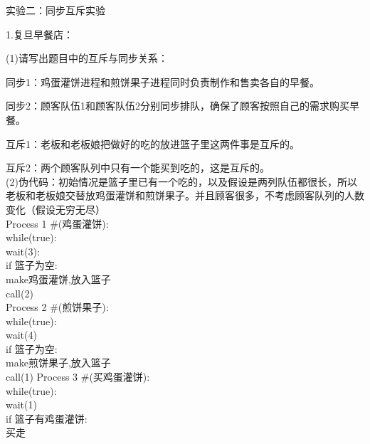 \documentclass[12pt]{article}
\begin{document}
\begin{Large}
    \noindent 实验二：同步互斥实验\\
\end{Large}
\begin{large}
    \noindent 1.复旦早餐店：\\
\end{large}
(1)请写出题目中的互斥与同步关系：\par
同步1：鸡蛋灌饼进程和煎饼果子进程同时负责制作和售卖各自的早餐。\par
同步2：顾客队伍1和顾客队伍2分别同步排队，确保了顾客按照自己的需求购买早餐。\par
互斥1：老板和老板娘把做好的吃的放进篮子里这两件事是互斥的。\par
互斥2：两个顾客队列中只有一个能买到吃的，这是互斥的。\\
(2)伪代码：初始情况是篮子里已有一个吃的，以及假设是两列队伍都很长，所以老板和老板娘交替放鸡蛋灌饼和煎饼果子。并且顾客很多，不考虑顾客队列的人数变化（假设无穷无尽）\\
Process 1 \#(鸡蛋灌饼):\\
\hspace*{2em}while(true):\\
\hspace*{2em}wait(3):\\
\hspace*{4em}if 篮子为空:\\
\hspace*{6em}make鸡蛋灌饼,放入篮子\\
\hspace*{6em}call(2)\\

\noindent Process 2 \#(煎饼果子):\\
\hspace*{2em}while(true):\\
\hspace*{4em}wait(4)\\
\hspace*{4em}if 篮子为空:\\
\hspace*{6em}make煎饼果子,放入篮子\\
\hspace*{6em}call(1)
\newpage
\noindent Process 3 \#(买鸡蛋灌饼):\\
\hspace*{2em}while(true):\\
\hspace*{4em}wait(1)\\
\hspace*{4em}if 篮子有鸡蛋灌饼:\\
\hspace*{6em}买走\\
\end{document}
